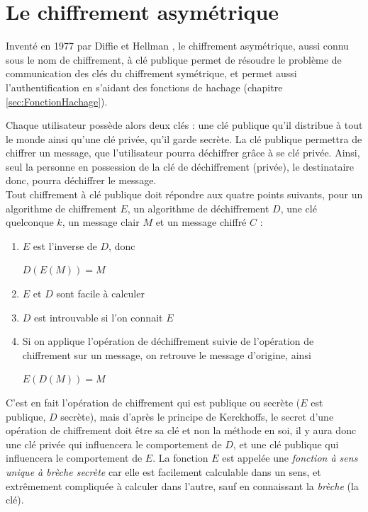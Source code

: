 \section{Le chiffrement asymétrique}
Inventé en 1977 par Diffie et Hellman
\cite{NewDirectionsInCryptography}, le chiffrement asymétrique, aussi
connu sous le nom de chiffrement, à clé publique permet de résoudre le
problème de communication des clés du chiffrement symétrique, et
permet aussi l'authentification en s'aidant des fonctions de hachage 
(chapitre \ref{sec:FonctionHachage}). 

Chaque utilisateur possède alors deux clés : une clé publique qu'il
distribue à tout le monde ainsi qu'une clé privée, qu'il garde
secrète. La clé publique permettra de chiffrer un message, que
l'utilisateur pourra déchiffrer grâce à se clé privée. Ainsi, seul la
personne en possession de la clé de déchiffrement (privée), le
destinataire donc, pourra déchiffrer le message. \\

Tout chiffrement à clé publique doit répondre aux quatre points
suivants, pour un algorithme de chiffrement $E$, un algorithme de
déchiffrement $D$, une clé quelconque $k$, un message clair $M$ et un
message chiffré $C$ : 
\begin{enumerate}
  \item $E$ est l'inverse de $D$, donc
    \begin{center}
      $D(E(M)) = M$
    \end{center}
  \item $E$ et $D$ sont facile à calculer
  \item $D$ est introuvable si l'on connait $E$
  \item Si on applique l'opération de déchiffrement suivie de
    l'opération de chiffrement sur un message, on retrouve le message
    d'origine, ainsi
    \begin{center}
      $E(D(M)) = M$
    \end{center}
\end{enumerate}

C'est en fait l'opération de chiffrement qui est publique ou secrète
($E$ est publique, $D$ secrète), mais d'après le principe de
Kerckhoffs, le secret d'une opération de chiffrement doit être sa clé
et non la méthode en soi, il y aura donc une clé privée qui
influencera le comportement de $D$, et une clé publique qui
influencera le comportement de $E$. La fonction $E$ est appelée une
\emph{fonction à sens unique à brèche secrète} 
car elle est facilement calculable dans un sens, et extrêmement
compliquée à calculer dans l'autre,
sauf en connaissant la \emph{brèche} (la clé).

